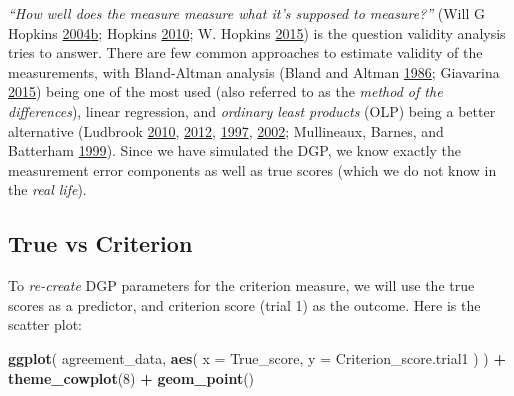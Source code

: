 \documentclass[
]{book}
\newenvironment{Shaded}{\begin{snugshade}}{\end{snugshade}}
\newcommand{\DataTypeTok}[1]{\textcolor[rgb]{0.13,0.29,0.53}{#1}}
\newcommand{\DecValTok}[1]{\textcolor[rgb]{0.00,0.00,0.81}{#1}}
\newcommand{\KeywordTok}[1]{\textcolor[rgb]{0.13,0.29,0.53}{\textbf{#1}}}
\newcommand{\NormalTok}[1]{#1}
\newcommand{\OperatorTok}[1]{\textcolor[rgb]{0.81,0.36,0.00}{\textbf{#1}}}
\newcommand{\StringTok}[1]{\textcolor[rgb]{0.31,0.60,0.02}{#1}}
\begin{document}
\emph{``How well does the measure measure what it's supposed to measure?''} (Will G Hopkins \protect\hyperlink{ref-hopkinsBiasBlandAltmanNot2004}{2004}\protect\hyperlink{ref-hopkinsBiasBlandAltmanNot2004}{b}; Hopkins \protect\hyperlink{ref-hopkinsSocraticDialogueComparison2010}{2010}; W. Hopkins \protect\hyperlink{ref-hopkinsSpreadsheetsAnalysisValidity2015}{2015}) is the question validity analysis tries to answer. There are few common approaches to estimate validity of the measurements, with Bland-Altman analysis (Bland and Altman \protect\hyperlink{ref-blandStatisticalMethodsAssessing1986}{1986}; Giavarina \protect\hyperlink{ref-giavarinaUnderstandingBlandAltman2015}{2015}) being one of the most used (also referred to as the \emph{method of the differences}), linear regression, and \emph{ordinary least products} (OLP) being a better alternative (Ludbrook \protect\hyperlink{ref-ludbrookLinearRegressionAnalysis2010}{2010}, \protect\hyperlink{ref-ludbrookPrimerBiomedicalScientists2012}{2012}, \protect\hyperlink{ref-ludbrookSPECIALARTICLECOMPARING1997}{1997}, \protect\hyperlink{ref-ludbrookStatisticalTechniquesComparing2002}{2002}; Mullineaux, Barnes, and Batterham \protect\hyperlink{ref-mullineauxAssessmentBiasComparing1999}{1999}). Since we have simulated the DGP, we know exactly the measurement error components as well as true scores (which we do not know in the \emph{real life}).

\hypertarget{true-vs-criterion}{%
\subsection{True vs Criterion}\label{true-vs-criterion}}

To \emph{re-create} DGP parameters for the criterion measure, we will use the true scores as a predictor, and criterion score (trial 1) as the outcome. Here is the scatter plot:

\begin{Shaded}
\begin{Highlighting}[]
\KeywordTok{ggplot}\NormalTok{(}
\NormalTok{  agreement\_data,}
  \KeywordTok{aes}\NormalTok{(}
    \DataTypeTok{x =}\NormalTok{ True\_score,}
    \DataTypeTok{y =}\NormalTok{ Criterion\_score.trial1}
\NormalTok{  )}
\NormalTok{) }\OperatorTok{+}
\StringTok{  }\KeywordTok{theme\_cowplot}\NormalTok{(}\DecValTok{8}\NormalTok{) }\OperatorTok{+}
\StringTok{  }\KeywordTok{geom\_point}\NormalTok{()}
\end{Highlighting}
\end{Shaded}
\end{document}
